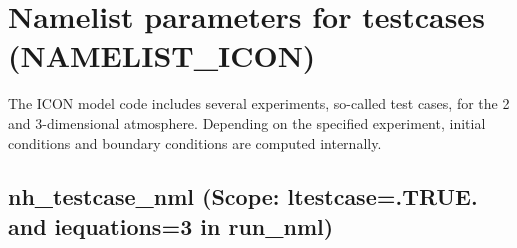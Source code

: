 
\section{Namelist parameters for testcases (NAMELIST\_ICON)}

The ICON model code includes several experiments, so-called test cases,
for the 2 and 3-dimensional atmosphere. Depending on the specified experiment, 
initial conditions and boundary conditions are computed internally.



\subsection{nh\_testcase\_nml (Scope: ltestcase=.TRUE. and iequations=3 in run\_nml)}

